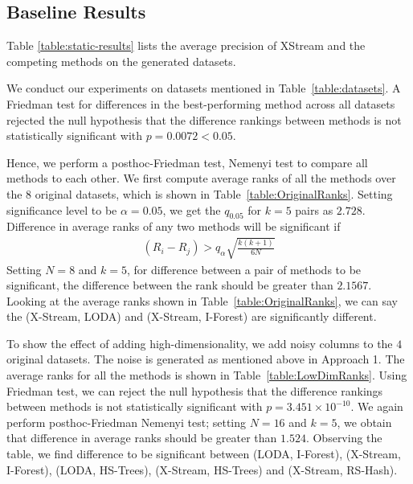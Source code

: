 \subsection{Baseline Results}

Table \ref{table:static-results} lists the average precision of XStream and the competing methods on the generated datasets.

We conduct our experiments on datasets mentioned in Table~\ref{table:datasets}. A Friedman test for differences in the best-performing method across all datasets rejected the null hypothesis that the difference rankings between methods is not statistically significant with $p=0.0072 < 0.05$.

Hence, we perform a posthoc-Friedman test, Nemenyi test to compare all methods to each other. We first compute average ranks of all the methods over the  $8$ original datasets, which is shown in Table~\ref{table:OriginalRanks}. Setting significance level to be $\alpha=0.05$, we get the $q_{0.05}$ for $k=5$ pairs as $2.728$. Difference in average ranks of any two methods will be significant if 
\begin{align}
(R_{i} - R_{j}) > q_{\alpha} \sqrt{\frac{k(k+1)}{6N}}
\end{align}
Setting $N=8$ and $k=5$, for difference between a pair of methods to be significant, the difference between the rank should be greater than $2.1567$. Looking at the average ranks shown in Table~\ref{table:OriginalRanks}, we can say the (X-Stream, LODA) and (X-Stream, I-Forest) are significantly different.

To show the effect of adding high-dimensionality, we add noisy columns to the $4$ original datasets. The noise is generated as mentioned above in Approach 1. The average ranks for all the methods is shown in Table~\ref{table:LowDimRanks}. Using Friedman test, we can reject the null hypothesis that the difference rankings between methods is not statistically significant with $p=3.451\times 10^{-10}$. We again perform posthoc-Friedman Nemenyi test; setting $N=16$ and $k=5$, we obtain that difference in average ranks should be greater than $1.524$. Observing the table, we find difference to be significant between (LODA, I-Forest), (X-Stream, I-Forest), (LODA, HS-Trees), (X-Stream, HS-Trees) and (X-Stream, RS-Hash).

